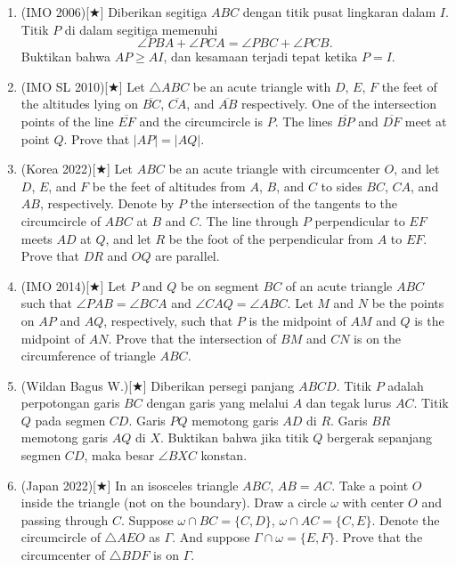 \documentclass[letterpaper, 13pt]{scrartcl}
\begin{document}
\begin{enumerate}
  \newpage
  \item (IMO 2006)[$\bigstar$] Diberikan segitiga $ABC$ dengan titik pusat lingkaran dalam $I$. Titik $P$ di dalam segitiga memenuhi
  \[
  \angle PBA + \angle PCA = \angle PBC + \angle PCB.
  \]
  Buktikan bahwa $AP \ge AI$, dan kesamaan terjadi tepat ketika $P = I$.

  \item (IMO SL 2010)[$\bigstar$] Let $\triangle ABC$ be an acute triangle with $D$, $E$, $F$ the feet of the altitudes lying on $\overline{BC}$, $\overline{CA}$, and $\overline{AB}$ respectively. One of the intersection points of the line $\overline{EF}$ and the circumcircle is $P$. The lines $\overline{BP}$ and $\overline{DF}$ meet at point $Q$. Prove that $|AP| = |AQ|$.

  \item (Korea 2022)[$\bigstar$] Let $ABC$ be an acute triangle with circumcenter $O$, and let $D$, $E$, and $F$ be the feet of altitudes from $A$, $B$, and $C$ to sides $BC$, $CA$, and $AB$, respectively. Denote by $P$ the intersection of the tangents to the circumcircle of $ABC$ at $B$ and $C$. The line through $P$ perpendicular to $EF$ meets $AD$ at $Q$, and let $R$ be the foot of the perpendicular from $A$ to $EF$. Prove that $DR$ and $OQ$ are parallel.

  \item (IMO 2014)[$\bigstar$] Let $P$ and $Q$ be on segment $BC$ of an acute triangle $ABC$ such that $\angle PAB=\angle BCA$ and $\angle CAQ=\angle ABC$. Let $M$ and $N$ be the points on $AP$ and $AQ$, respectively, such that $P$ is the midpoint of $AM$ and $Q$ is the midpoint of $AN$. Prove that the intersection of $BM$ and $CN$ is on the circumference of triangle $ABC$.

  \item (Wildan Bagus W.)[$\bigstar$] Diberikan persegi panjang $ABCD$. Titik $P$ adalah perpotongan garis $BC$ dengan garis yang melalui $A$ dan tegak lurus $AC$. Titik $Q$ pada segmen $CD$. Garis $PQ$ memotong garis $AD$ di $R$. Garis $BR$ memotong garis $AQ$ di $X$. Buktikan bahwa jika titik $Q$ bergerak sepanjang segmen $CD$, maka besar $\angle BXC$ konstan.

  \item (Japan 2022)[$\bigstar$] In an isosceles triangle $ABC$, $AB=AC$. Take a point $O$ inside the triangle (not on the boundary). Draw a circle $\omega$ with center $O$ and passing through $C$. Suppose $\omega\cap BC=\{C,D\}$, $\omega\cap AC=\{C,E\}$. Denote the circumcircle of $\triangle AEO$ as $\Gamma$. And suppose $\Gamma\cap\omega=\{E,F\}$. Prove that the circumcenter of $\triangle BDF$ is on $\Gamma$.


\end{enumerate}
\end{document}
